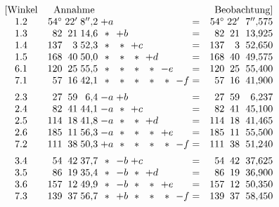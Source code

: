 \[
\begin{array}{@{}c@{\quad}r@{\;}r@{\;}r@{\;}c@{\;}c@{\;}c@{\;}c@{\;}c@{\;}c@{\;}c@{\quad}r@{\;}r@{\;}r@{}}
 [\text{Winkel}&\multicolumn{3}{c}{\text{Annahme}}&&&&&&&&
 \multicolumn{3}{c@{}}{\text{Beobachtung}] }\\
 1.2&54^\circ&22'&8''{,}2&+a&&&&&&=&54^\circ&22'&7''{,}575\\
 1.3&82&21&14{,}6&\ast&+b&&&&&=&82&21&13{,}925\\
 1.4&137&3&52{,}3&\ast&\ast&+c&&&&=&137&3&52{,}650\\
 1.5&168&40&50{,}0&\ast&\ast&\ast&+d&&&=&168&40&49{,}575\\
 6.1&120&25&55{,}5&\ast&\ast&\ast&\ast&-e&&=&120&25&55{,}400\\
 7.1&57&16&42{,}1&\ast&\ast&\ast&\ast&\ast&-f&=&57&16&41{,}900\\[5pt]
 2.3&27&59&6{,}4&-a&+b&&&&&=&27&59&6{,}237\\
 2.4&82&41&44{,}1&-a&\ast&+c&&&&=&82&41&45{,}100\\
 2.5&114&18&41{,}8&-a&\ast&\ast&+d&&&=&114&18&41{,}465\\
 2.6&185&11&56{,}3&-a&\ast&\ast&\ast&+e&&=&185&11&55{,}500\\
 7.2&111&38&50{,}3&+a&\ast&\ast&\ast&\ast&-f&=&111&38&51{,}240\\[5pt]
 3.4&54&42&37{,}7&\ast&-b&+c&&&&=&54&42&37{,}625\\
 3.5&86&19&35{,}4&\ast&-b&\ast&+d&&&=&86&19&36{,}900\\
 3.6&157&12&49{,}9&\ast&-b&\ast&\ast&+e&&=&157&12&50{,}350\\
 7.3&139&37&56{,}7&\ast&+b&\ast&\ast&\ast&-f&=&139&37&58{,}450
\end{array}
\]
